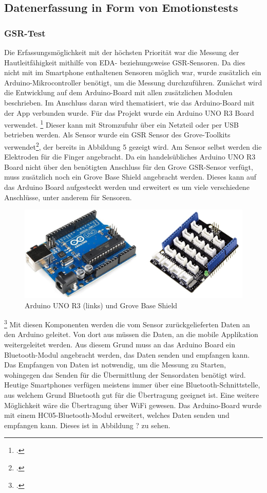 \subsection{Datenerfassung in Form von Emotionstests}
\subsubsection{GSR-Test}
Die Erfassungsmöglichkeit mit der höchsten Priorität war die Messung der Hautleitfähigkeit mithilfe von EDA- beziehungsweise GSR-Sensoren. Da dies nicht mit im Smartphone enthaltenen Sensoren möglich war, wurde zusätzlich ein Arduino-Mikrocontroller benötigt, um die Messung durchzuführen. Zunächst wird die Entwicklung auf dem Arduino-Board mit allen zusätzlichen Modulen beschrieben. Im Anschluss daran wird thematisiert, wie das Arduino-Board mit der App verbunden wurde. \newline
Für das Projekt wurde ein Arduino UNO R3 Board verwendet. \footcite[Vgl.][]{Ard18} Dieser kann mit Stromzufuhr über ein Netzteil oder per USB betrieben werden. Als Sensor wurde ein GSR Sensor des Grove-Toolkits verwendet\footcite[Vgl.][]{Gro18}, der bereits in Abbildung 5 gezeigt wird. Am Sensor selbst werden die Elektroden für die Finger angebracht. Da ein handelsübliches Arduino UNO R3 Board nicht über den benötigten Anschluss für den Grove GSR-Sensor verfügt, muss zusätzlich noch ein Grove Base Shield angebracht werden. Dieses kann auf das Arduino Board aufgesteckt werden und erweitert es um viele verschiedene Anschlüsse, unter anderem für Sensoren.
\begin{figure}[h]
	\centering
	\includegraphics[width=16cm]{Bilder/arduino.jpg}
	\caption[Arduino UNO R3 (links) und Grove Base Shield]{Arduino UNO R3 (links) und Grove Base Shield\footnotemark}
\end{figure}%
\footcitetext[Bilder von:][]{Sou18, Rei18}
\newline \newline
Mit diesen Komponenten werden die vom Sensor zurückgelieferten Daten an den Arduino geleitet. Von dort aus müssen die Daten, an die mobile Applikation weitergeleitet werden. Aus diesem Grund muss an das Arduino Board ein Bluetooth-Modul angebracht werden, das Daten senden und empfangen kann. Das Empfangen von Daten ist notwendig, um die Messung zu Starten, wohingegen das Senden für die Übermittlung der Sensordaten benötigt wird. Heutige Smartphones verfügen meistens immer über eine Bluetooth-Schnittstelle, aus welchem Grund Bluetooth gut für die Übertragung geeignet ist. Eine weitere Möglichkeit wäre die Übertragung über WiFi gewesen. Das Arduino-Board wurde mit einem HC05-Bluetooth-Modul erweitert, welches Daten senden und empfangen kann. Dieses ist in Abbildung ? zu sehen.
